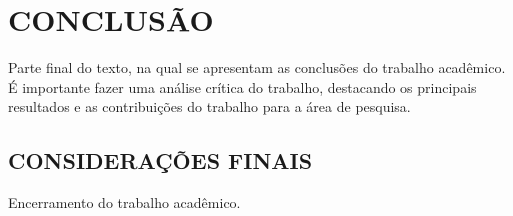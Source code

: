 
\chapter{CONCLUSÃO}
\label{chap:conclusao}

Parte final do texto, na qual se apresentam as conclusões do trabalho acadêmico. É importante fazer uma análise crítica do trabalho, destacando os principais resultados e as contribuições do trabalho para a área de pesquisa.

\section{CONSIDERAÇÕES FINAIS}
\label{sec:consideracoesFinais}

Encerramento do trabalho acadêmico.
